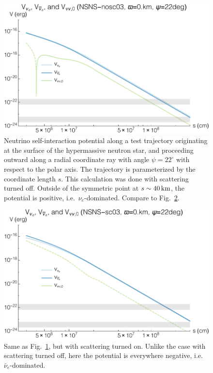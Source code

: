 \documentclass[aps,floatfix,prd,superscriptaddress,twocolumn]{revtex4-1}
\begin{document}
\begin{figure}
  \includegraphics[width=\columnwidth]{20170619-potentials-Vnue_Vnua_Vnu-000Mo-022deg-noscat}
  \caption{Neutrino self-interaction potential along a test trajectory
    originating at the surface of the hypermassive neutron star, and
    proceeding outward along a radial coordinate ray with angle
    $\psi=22^{\circ}$ with respect to the polar axis.
    The trajectory is parameterized by the coordinate length $s$.
    This calculation was done with scattering turned off.
    Outside of the symmetric point at $s\sim40\,{\rm km}$, the potential is
    positive, i.e.\ $\nu_e$-dominated.
    Compare to Fig.~\ref{fig:V_nunu-scat}.
    }
  \label{fig:V_nunu-noscat}
\end{figure}

\begin{figure}
  \includegraphics[width=\columnwidth]{20170619-potentials-Vnue_Vnua_Vnu-000Mo-022deg-scat}
  \caption{Same as Fig.~\ref{fig:V_nunu-noscat},
    but with scattering turned on.
    Unlike the case with scattering turned off, here the potential is
    everywhere negative, i.e.\ $\bar{\nu}_e$-dominated.
    }
  \label{fig:V_nunu-scat}
\end{figure}
\end{document}
